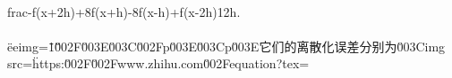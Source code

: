 \\frac{-f(x+2h)+8f(x+h)-8f(x-h)+f(x-2h)}{12h}.\\\\ \" eeimg=\"1\"\u002F\u003E\u003C\u002Fp\u003E\u003Cp\u003E它们的离散化误差分别为\u003Cimg src=\"https:\u002F\u002Fwww.zhihu.com\u002Fequation?tex=%